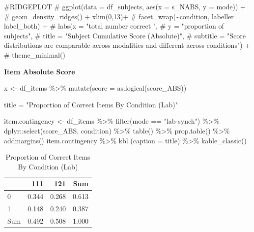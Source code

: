 \documentclass[
  letterpaper,
  DIV=11,
  numbers=noendperiod]{scrreprt}
\newenvironment{Shaded}{\begin{snugshade}}{\end{snugshade}}
\newcommand{\AttributeTok}[1]{\textcolor[rgb]{0.40,0.45,0.13}{#1}}
\newcommand{\CommentTok}[1]{\textcolor[rgb]{0.37,0.37,0.37}{#1}}
\newcommand{\FunctionTok}[1]{\textcolor[rgb]{0.28,0.35,0.67}{#1}}
\newcommand{\NormalTok}[1]{\textcolor[rgb]{0.00,0.23,0.31}{#1}}
\newcommand{\OtherTok}[1]{\textcolor[rgb]{0.00,0.23,0.31}{#1}}
\newcommand{\SpecialCharTok}[1]{\textcolor[rgb]{0.37,0.37,0.37}{#1}}
\newcommand{\StringTok}[1]{\textcolor[rgb]{0.13,0.47,0.30}{#1}}
\begin{document}
\begin{Shaded}
\begin{Highlighting}[]
\CommentTok{\#RIDGEPLOT}
\CommentTok{\# ggplot(data = df\_subjects, aes(x = s\_NABS, y = mode)) +}
\CommentTok{\#   geom\_density\_ridges() + xlim(0,13)+}
\CommentTok{\#   facet\_wrap(\textasciitilde{}condition, labeller = label\_both) +}
\CommentTok{\# labs(x = "total number correct ",}
\CommentTok{\# y = "proportion of subjects",}
\CommentTok{\#        title = "Subject Cumulative Score (Absolute)",}
\CommentTok{\#        subtitle = "Score distributions are comparable across modalities and different across conditions") +}
\CommentTok{\#   theme\_minimal()}
\end{Highlighting}
\end{Shaded}

\textbf{Item Absolute Score}

\begin{Shaded}
\begin{Highlighting}[]
\NormalTok{x }\OtherTok{\textless{}{-}}\NormalTok{ df\_items }\SpecialCharTok{\%\textgreater{}\%} \FunctionTok{mutate}\NormalTok{(}\AttributeTok{score =} \FunctionTok{as.logical}\NormalTok{(score\_ABS))}

\NormalTok{title }\OtherTok{=} \StringTok{"Proportion of Correct Items By Condition (Lab)"}

\NormalTok{item.contingency }\OtherTok{\textless{}{-}}\NormalTok{ df\_items }\SpecialCharTok{\%\textgreater{}\%} \FunctionTok{filter}\NormalTok{(mode }\SpecialCharTok{==} \StringTok{"lab{-}synch"}\NormalTok{) }\SpecialCharTok{\%\textgreater{}\%}\NormalTok{ dplyr}\SpecialCharTok{::}\FunctionTok{select}\NormalTok{(score\_ABS, condition) }\SpecialCharTok{\%\textgreater{}\%} \FunctionTok{table}\NormalTok{() }\SpecialCharTok{\%\textgreater{}\%} \FunctionTok{prop.table}\NormalTok{() }\SpecialCharTok{\%\textgreater{}\%} \FunctionTok{addmargins}\NormalTok{()}
\NormalTok{item.contingency }\SpecialCharTok{\%\textgreater{}\%} \FunctionTok{kbl}\NormalTok{ (}\AttributeTok{caption =}\NormalTok{ title) }\SpecialCharTok{\%\textgreater{}\%} \FunctionTok{kable\_classic}\NormalTok{()}
\end{Highlighting}
\end{Shaded}

\begin{table}

\caption{Proportion of Correct Items By Condition (Lab)}
\centering
\begin{tabular}[t]{l|r|r|r}
\hline
  & 111 & 121 & Sum\\
\hline
0 & 0.344 & 0.268 & 0.613\\
\hline
1 & 0.148 & 0.240 & 0.387\\
\hline
Sum & 0.492 & 0.508 & 1.000\\
\hline
\end{tabular}
\end{table}
\end{document}
